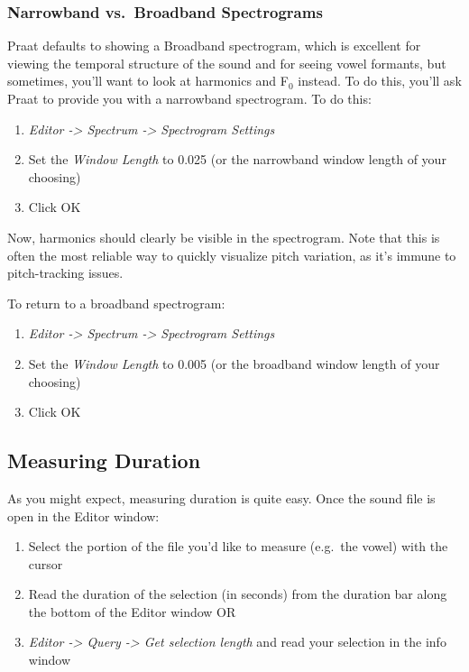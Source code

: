 \hypertarget{narrowband-vs.-broadband-spectrograms}{%
\subsubsection{Narrowband vs.~Broadband
Spectrograms}\label{narrowband-vs.-broadband-spectrograms}}

\label{subsec:broadnarrow} Praat defaults to showing a Broadband
spectrogram, which is excellent for viewing the temporal structure of
the sound and for seeing vowel formants, but sometimes, you'll want to
look at harmonics and F$_{0}$ instead. To do this, you'll ask Praat to
provide you with a narrowband spectrogram. To do this:

\begin{enumerate}
\def\labelenumi{\arabic{enumi}.}
\tightlist
\item
  \emph{Editor -\textgreater{} Spectrum -\textgreater{} Spectrogram
  Settings}
\item
  Set the \emph{Window Length} to 0.025 (or the narrowband window length
  of your choosing)
\item
  Click OK
\end{enumerate}

Now, harmonics should clearly be visible in the spectrogram. Note that
this is often the most reliable way to quickly visualize pitch
variation, as it's immune to pitch-tracking issues.

To return to a broadband spectrogram:

\begin{enumerate}
\def\labelenumi{\arabic{enumi}.}
\tightlist
\item
  \emph{Editor -\textgreater{} Spectrum -\textgreater{} Spectrogram
  Settings}
\item
  Set the \emph{Window Length} to 0.005 (or the broadband window length
  of your choosing)
\item
  Click OK
\end{enumerate}

\hypertarget{measuring-duration}{%
\subsection{Measuring Duration}\label{measuring-duration}}

As you might expect, measuring duration is quite easy. Once the sound
file is open in the Editor window:

\begin{enumerate}
\def\labelenumi{\arabic{enumi}.}
\tightlist
\item
  Select the portion of the file you'd like to measure (e.g.~the vowel)
  with the cursor
\item
  Read the duration of the selection (in seconds) from the duration bar
  along the bottom of the Editor window OR
\item
  \emph{Editor -\textgreater{} Query -\textgreater{} Get selection
  length} and read your selection in the info window
\end{enumerate}

